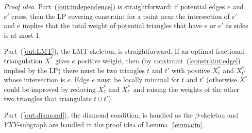 \documentclass[final]{siamltex}
\newcommand{\edge}{e}
\newcommand{\tri}{t}  \newcommand{\vertex}{v}
\newcommand{\fracTriang}{X}
\newcommand{\YXY}{YXY\xspace}
\newenvironment{proofidea}{\par{\it Proof idea}. \ignorespaces}{}
\begin{document}
\begin{proofidea}
  Part~(\ref{out:independence}) is straightforward: if potential edges $\edge$ and $\edge'$ cross,
  then the LP covering constraint for a point near the intersection of $\edge'$ and $\edge$
  implies that the total weight of potential triangles that have $\edge$ or $\edge'$ as sides is at most 1.

  Part~(\ref{out:LMT}), the LMT skeleton, is straightforward.
  If an optimal fractional triangulation $\fracTriang^*$ gives $\edge$ positive weight,
  then (by constraint~(\ref{constraint:edge}) implied by the LP)
  there must be two triangles $\tri$ and $\tri'$ with positive $\fracTriang^*_\tri$ and $\fracTriang^*_{\tri'}$
  whose intersection is $\edge$.
  Edge $\edge$ must be locally minimal for $\tri$ and $\tri'$ 
  (otherwise $\fracTriang^*$ could be improved by reducing $\fracTriang^*_\tri$ and $\fracTriang^*_{\tri'}$
  and raising the weights of the other two triangles that triangulate $\tri\cup \tri'$).

  Part~(\ref{out:diamond}), the diamond condition, 
  is handled as the $\beta$-skeleton and $\YXY$-subgraph
  are handled in the proof idea of Lemma~\ref{lemma:in}.
\end{proofidea}
\end{document}
